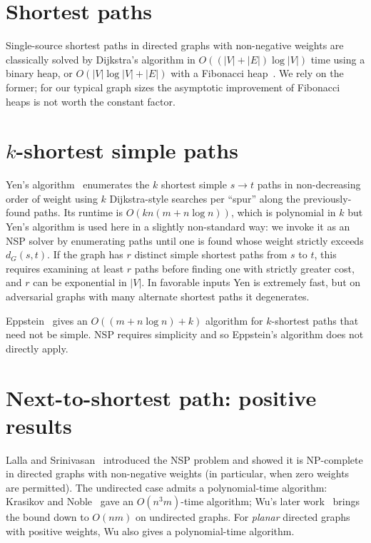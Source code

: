 \section{Shortest paths}

Single-source shortest paths in directed graphs with non-negative weights are
classically solved by Dijkstra's algorithm in
$O((|V|+|E|)\log|V|)$ time using a binary heap, or $O(|V|\log|V|+|E|)$ with a
Fibonacci heap~\cite{Dijkstra1959, FredmanTarjan1987}. We rely on the
former; for our typical graph sizes the asymptotic improvement of Fibonacci
heaps is not worth the constant factor.

\section{$k$-shortest simple paths}

Yen's algorithm~\cite{Yen1971} enumerates the $k$ shortest simple $s\to t$
paths in non-decreasing order of weight using $k$ Dijkstra-style searches per
``spur'' along the previously-found paths. Its runtime is
$O(kn(m+n\log n))$, which is polynomial in $k$ but Yen's algorithm is used
here in a slightly non-standard way: we invoke it as an NSP solver by
enumerating paths until one is found whose weight strictly exceeds
$d_G(s,t)$. If the graph has $r$ distinct simple shortest paths from $s$ to
$t$, this requires examining at least $r$ paths before finding one with
strictly greater cost, and $r$ can be exponential in $|V|$. In favorable
inputs Yen is extremely fast, but on adversarial graphs with many alternate
shortest paths it degenerates.

Eppstein~\cite{Eppstein1998} gives an $O((m + n\log n) + k)$ algorithm for
$k$-shortest paths that need not be simple. NSP requires simplicity and so
Eppstein's algorithm does not directly apply.

\section{Next-to-shortest path: positive results}

Lalla and Srinivasan~\cite{LallaSrinivasan1992} introduced the NSP problem
and showed it is NP-complete in directed graphs with non-negative weights (in
particular, when zero weights are permitted). The undirected case admits a
polynomial-time algorithm: Krasikov and Noble~\cite{KrasikovNoble2004}
gave an $O(n^3 m)$-time algorithm; Wu's later
work~\cite{Wu2010} brings the bound down to $O(nm)$ on undirected graphs.
For \emph{planar} directed graphs with positive weights, Wu also gives a
polynomial-time algorithm.

